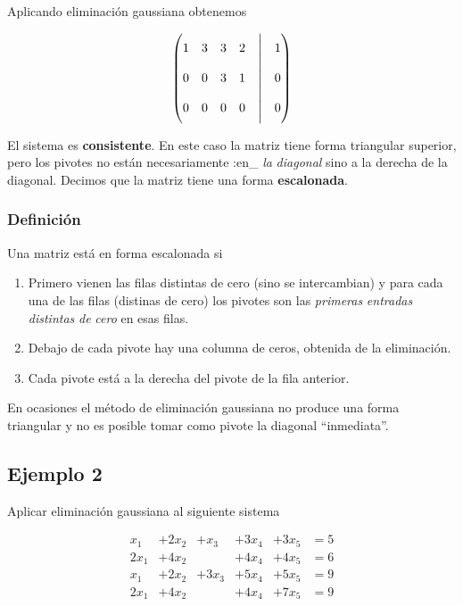 \documentclass[
]{article}
\begin{document}
Aplicando eliminación gaussiana obtenemos

\[
\begin{pmatrix}
                                  1   &   3 &   3  & 2 &\biggm| & 1  \\
                                  0   &   0 &   3  & 1 &\biggm| & 0   \\
                                  0   &   0 &   0  & 0 &\biggm| & 0
                                \end{pmatrix}
\]

El sistema es \textbf{consistente}. En este caso la matriz tiene forma
triangular superior, pero los pivotes no están necesariamente :en\_
\emph{la} \emph{diagonal} sino a la derecha de la diagonal. Decimos que
la matriz tiene una forma \textbf{escalonada}.

\hypertarget{definiciuxf3n-4}{%
\subsubsection{Definición}\label{definiciuxf3n-4}}

Una matriz está en forma escalonada si

\begin{enumerate}
\def\labelenumi{\arabic{enumi})}
\item
  Primero vienen las filas distintas de cero (sino se intercambian) y
  para cada una de las filas (distinas de cero) los pivotes son las
  \emph{primeras} \emph{entradas} \emph{distintas} \emph{de} \emph{cero}
  en esas filas.
\item
  Debajo de cada pivote hay una columna de ceros, obtenida de la
  eliminación.
\item
  Cada pivote está a la derecha del pivote de la fila anterior.
\end{enumerate}

En ocasiones el método de eliminación gaussiana no produce una forma
triangular y no es posible tomar como pivote la diagonal ``inmediata''.

\hypertarget{ejemplo-2-2}{%
\subsection{Ejemplo 2}\label{ejemplo-2-2}}

Aplicar eliminación gaussiana al siguiente sistema

\begin{equation*}
  \begin{matrix}
           x_1  & +2 x_2 & +x_3 & +3x_4 & +3x_5& = 5  \\
           2x_1 & +4 x_2 &      & +4x_4 & +4x_5& = 6  \\
           x_1  & +2 x_2 & +3x_3 & +5x_4 & +5x_5& = 9  \\
           2x_1  & +4 x_2 &      & +4x_4 & +7x_5& = 9  \\
  \end{matrix}
\end{equation*}
\end{document}
